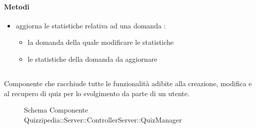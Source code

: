 \paragraph{Metodi}
\begin{itemize}
\item {}
\newline
aggiorna le statistiche relativa ad una domanda
\newline
{} :
\begin{itemize}
\item {}
\newline
la domanda della quale modificare le statistiche
\item {}
\newline
le statistiche della domanda da aggiornare
\end{itemize}
\end{itemize}
\subsection{}
Componente che racchiude tutte le funzionalità adibite alla creazione, modifica e al recupero di quiz per lo svolgimento da parte di un utente.
\begin{figure}[H]
\centering
\noindent{}
\caption[Schema Componente Quizzipedia::Server::ControllerServer::QuizManager]{Schema Componente Quizzipedia::Server::ControllerServer::QuizManager}
\end{figure}
